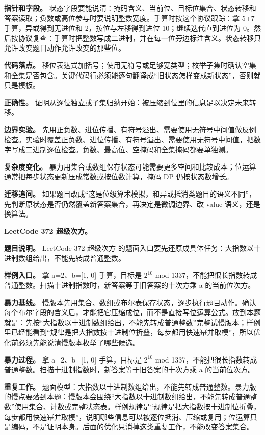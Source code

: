 \textbf{指针和字段。} 状态字段要能说清：掩码含义、当前位、目标位集合、状态转移和答案读取；负数或高位参与时要说明整数宽度。手算时按这个协议跟踪：拿 5+7 手算，异或得到无进位和 2，按位与左移得到进位 10；继续迭代直到进位为 0。然后按协议复查：手算时把整数写成二进制，并在每一位旁边标注含义。状态转移只允许改变题目动作允许改变的那些位。

\textbf{代码落点。} 移位表达式加括号；使用无符号或足够宽类型；枚举子集时确认空集和全集是否包含。关键代码行必须能逐句翻译成“旧状态怎样变成新状态”，否则就只是模板。

\textbf{正确性。} 证明从逐位独立或子集归纳开始：被压缩到位里的信息足以决定未来转移。

\textbf{边界实验。} 先用正负数、进位传播、有符号溢出、需要使用无符号中间值做反例检查。实验时覆盖正负数、进位传播、有符号溢出、需要使用无符号中间值，把数字写成二进制逐位检查。负数、最高位、空掩码和全集掩码都要单独测。

\textbf{复杂度变化。} 暴力用集合或数组保存状态可能需要更多空间和比较成本；位运算通常把每步状态更新压成常数或按位数计算，掩码 DP 仍按状态数增长。

\textbf{迁移追问。} 如果题目改成“这是位级算术模拟，和异或抵消类题目的语义不同”，先判断原状态是否仍然覆盖新答案集合，再决定是微调边界、改 value 语义，还是换算法。

\noindent\textbf{LeetCode 372 超级次方。}

\textbf{题目说明。} LeetCode 372 超级次方 的题面入口要先还原成具体任务：大指数以十进制数组给出，不能先转成普通整数。

\textbf{样例入口。} 拿 a=2、b=[1, 0] 手算，目标是 \ensuremath{2^{10}} mod 1337，不能把很长指数转成普通整数。扫描十进制指数时，新答案等于旧答案的十次方乘 a 的当前位次方。

\textbf{暴力基线。} 慢版本先用集合、数组或布尔表保存状态，逐步执行题目动作。确认每个布尔字段的含义后，才能把它压缩成位，而不是直接写位运算公式。放到本题就是：先按“大指数以十进制数组给出，不能先转成普通整数”完整试慢版本；样例里已经能看到“规律是把大指数按十进制位折叠，每步都用快速幂并取模”，所以优化前必须先能说清慢版本枚举了哪些候选。

\textbf{暴力过程。} 拿 a=2、b=[1, 0] 手算，目标是 \ensuremath{2^{10}} mod 1337，不能把很长指数转成普通整数。扫描十进制指数时，新答案等于旧答案的十次方乘 a 的当前位次方。

\textbf{重复工作。} 题面模型：大指数以十进制数组给出，不能先转成普通整数。暴力版的慢点要落到本题：慢版本会围绕“大指数以十进制数组给出，不能先转成普通整数”使用集合、计数或完整状态表。样例规律是“规律是把大指数按十进制位折叠，每步都用快速幂并取模”，说明哪些信息可以被逐位抵消、压缩或复用；位运算只是编码，不是证明本身。后面的优化只消掉这类重复工作，不能改变答案集合。

